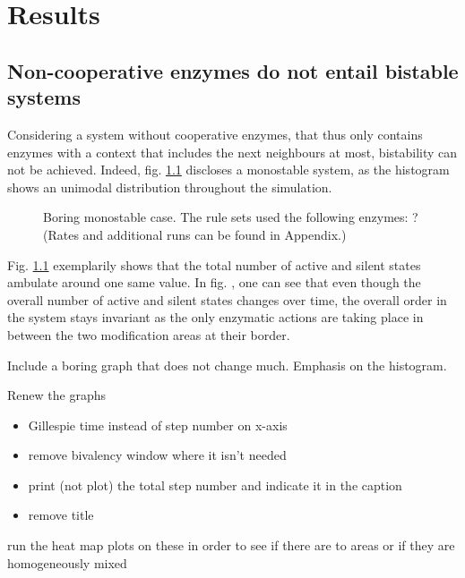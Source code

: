 \chapter{Results}
    \label{cha:results}
    \section{Non-cooperative enzymes do not entail bistable systems}
        Considering a system without cooperative enzymes, that thus only contains enzymes with a context that includes the next neighbours at most, bistability can not be achieved. Indeed, fig. \ref{img:linearCase} discloses a monostable system, as the histogram shows an unimodal distribution throughout the simulation.\\ %
        \begin{figure}[htpb!]
            \centering
            \caption{Boring monostable case. The rule sets used the following enzymes: ? (Rates and additional runs can be found in Appendix.)}
            \label{img:linearCase}
        \end{figure}
        Fig. \ref{img:linearCase} exemplarily shows that the total number of active and silent states ambulate around one same value. In fig. %
        , one can see that even though the overall number of active and silent states changes over time, the overall order in the system stays invariant as the only enzymatic actions are taking place in between the two modification areas at their border. %
        \begin{itemize}
            {
                \color{red}
                \item Include a boring graph that does not change much. Emphasis on the histogram.  %
                \item Renew the graphs
                    \begin{itemize}
                        \item Gillespie time instead of step number on x-axis
                        \item remove bivalency window where it isn't needed
                        \item print (not plot) the total step number and indicate it in the caption
                        \item remove title
                    \end{itemize}
                \item run the heat map plots on these in order to see if there are to areas or if they are homogeneously mixed
            }
        \end{itemize}
